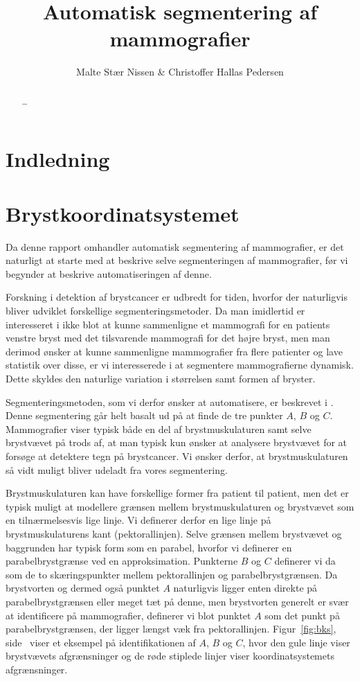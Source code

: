 \documentclass[11pt,a4paper]{article}
\title{Automatisk segmentering af mammografier}
\author{Malte Stær Nissen \& Christoffer Hallas Pedersen}
\begin{document}

\newpage
\clearpage
{}
\tableofcontents

\newpage

\begin{abstract}
\ldots
\end{abstract}

\newpage

\clearpage
{}

\section{Indledning}

\section{Brystkoordinatsystemet}
Da denne rapport omhandler automatisk segmentering af mammografier, er det naturligt at starte med at beskrive selve segmenteringen af mammografier, før vi begynder at beskrive automatiseringen af denne.

Forskning i detektion af brystcancer er udbredt for tiden, hvorfor der naturligvis bliver udviklet forskellige segmenteringsmetoder. Da man imidlertid er interesseret i ikke blot at kunne sammenligne et mammografi for en patients venstre bryst med det tilsvarende mammografi for det højre bryst, men man derimod ønsker at kunne sammenligne mammografier fra flere patienter og lave statistik over disse, er vi interesserede i at segmentere mammografierne dynamisk. Dette skyldes den naturlige variation i størrelsen samt formen af bryster.

Segmenteringsmetoden, som vi derfor ønsker at automatisere, er beskrevet i \cite{brandtetal}. Denne segmentering går helt basalt ud på at finde de tre punkter $A$, $B$ og $C$. Mammografier viser typisk både en del af brystmuskulaturen samt selve brystvævet på trods af, at man typisk kun ønsker at analysere brystvævet for at forsøge at detektere tegn på brystcancer. Vi ønsker derfor, at brystmuskulaturen så vidt muligt bliver udeladt fra vores segmentering. 

Brystmuskulaturen kan have forskellige former fra patient til patient, men det er typisk muligt at modellere grænsen mellem brystmuskulaturen og brystvævet som en tilnærmelsesvis lige linje. Vi definerer derfor en lige linje på brystmuskulaturens kant (pektorallinjen). Selve grænsen mellem brystvævet og baggrunden har typisk form som en parabel, hvorfor vi definerer en parabelbrystgrænse ved en approksimation. Punkterne $B$ og $C$ definerer vi da som de to skæringspunkter mellem pektorallinjen og parabelbrystgrænsen. Da brystvorten og dermed også punktet $A$ naturligvis ligger enten direkte på parabelbrystgrænsen eller meget tæt på denne, men brystvorten generelt er svær at identificere på mammografier, definerer vi blot punktet $A$ som det punkt på parabelbrystgrænsen, der ligger længst væk fra pektorallinjen. Figur~\ref{fig:bks}, side~\pageref{fig:bks} viser et eksempel på identifikationen af $A$, $B$ og $C$, hvor den gule linje viser brystvævets afgrænsninger og de røde stiplede linjer viser koordinatsystemets afgrænsninger.
\end{document}
